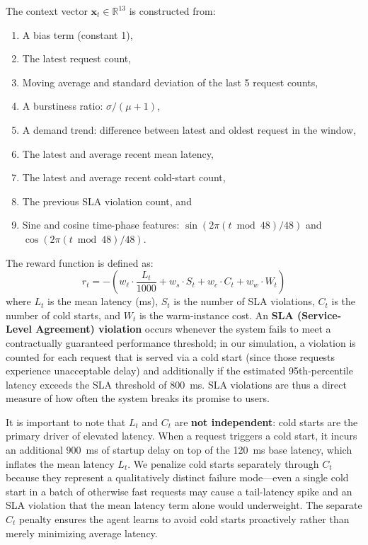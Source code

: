 \documentclass[11pt]{article}
\begin{document}
The context vector $\mathbf{x}_t \in \mathbb{R}^{13}$ is constructed from:
\begin{enumerate}[nosep]
    \item A bias term (constant 1),
    \item The latest request count,
    \item Moving average and standard deviation of the last 5 request counts,
    \item A burstiness ratio: $\sigma / (\mu + 1)$,
    \item A demand trend: difference between latest and oldest request in the window,
    \item The latest and average recent mean latency,
    \item The latest and average recent cold-start count,
    \item The previous SLA violation count, and
    \item Sine and cosine time-phase features: $\sin(2\pi (t \bmod 48)/48)$ and $\cos(2\pi (t \bmod 48)/48)$.
\end{enumerate}

The reward function is defined as:
\begin{equation}
    r_t = -\left( w_\ell \cdot \frac{L_t}{1000} + w_s \cdot S_t + w_c \cdot C_t + w_w \cdot W_t \right)
\end{equation}
where $L_t$ is the mean latency (ms), $S_t$ is the number of SLA violations, $C_t$ is the number of cold starts, and $W_t$ is the warm-instance cost. An \textbf{SLA (Service-Level Agreement) violation} occurs whenever the system fails to meet a contractually guaranteed performance threshold; in our simulation, a violation is counted for each request that is served via a cold start (since those requests experience unacceptable delay) and additionally if the estimated 95th-percentile latency exceeds the SLA threshold of 800~ms. SLA violations are thus a direct measure of how often the system breaks its promise to users.

It is important to note that $L_t$ and $C_t$ are \textbf{not independent}: cold starts are the primary driver of elevated latency. When a request triggers a cold start, it incurs an additional 900~ms of startup delay on top of the 120~ms base latency, which inflates the mean latency $L_t$. We penalize cold starts separately through $C_t$ because they represent a qualitatively distinct failure mode---even a single cold start in a batch of otherwise fast requests may cause a tail-latency spike and an SLA violation that the mean latency term alone would underweight. The separate $C_t$ penalty ensures the agent learns to avoid cold starts proactively rather than merely minimizing average latency.
\end{document}
